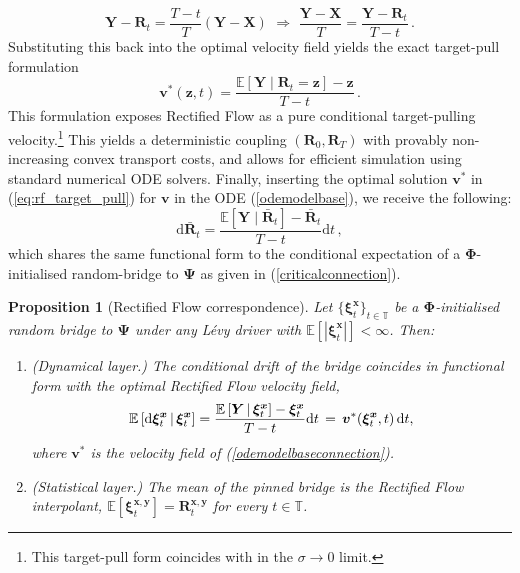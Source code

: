 \documentclass{article}
\newtheorem{prop}[thm]{Proposition}
\newcommand{\levy}{{L\'evy }}
\def\E{\mathbb{E}}
\def\T{\mathbb{T}}
\def\dd{\mathrm{d}}
\def\xib{\boldsymbol{\xi}}
\theoremstyle{definition}
\begin{document}
\begin{equation}
    \boldsymbol{Y} - \boldsymbol{R}_t = \frac{T-t}{T}(\boldsymbol{Y} - \boldsymbol{X}) \,\, \Rightarrow \,\,\frac{\boldsymbol{Y}-\boldsymbol{X}}{T} = \frac{\boldsymbol{Y} - \boldsymbol{R}_t}{T-t} \, .
\end{equation}
Substituting this back into the optimal velocity field yields the exact target-pull formulation
\begin{equation}
    \boldsymbol{v}^*(\boldsymbol{z},t) = \frac{\mathbb{E}[\boldsymbol{Y} \mid \boldsymbol{R}_t = \boldsymbol{z}] - \boldsymbol{z}}{T-t} \, . \label{eq:rf_target_pull}
\end{equation}
This formulation exposes Rectified Flow as a pure conditional target-pulling velocity.\footnote{This target-pull form coincides with \cite[Eq.~(5)]{shi2023diffusion} in the $\sigma\to0$ limit.} This yields a deterministic coupling $(\boldsymbol{R}_0, \boldsymbol{R}_T)$ with provably non-increasing convex transport costs, and allows for efficient simulation using standard numerical ODE solvers.
Finally, inserting the optimal solution $\boldsymbol{v}^*$ in (\ref{eq:rf_target_pull}) for $\boldsymbol{v}$ in the ODE (\ref{odemodelbase}), we receive the following:
\begin{equation}
    \mathrm{d}\bar{\boldsymbol{R}}_t = \frac{\mathbb{E}[\boldsymbol{Y} \mid \bar{\boldsymbol{R}}_t] - \bar{\boldsymbol{R}}_t}{T-t}\mathrm{d}t \, , \label{odemodelbaseconnection}
\end{equation}
which shares the same functional form to the conditional expectation of a $\boldsymbol{\Phi}$-initialised random-bridge to $\boldsymbol{\Psi}$ as given in (\ref{criticalconnection}).
\begin{prop}[Rectified Flow correspondence]
\label{coredynamicconnection}
Let $\{\xib^{\boldsymbol{x}}_t\}_{t\in\T}$ be a $\boldsymbol{\Phi}$-initialised random bridge to $\boldsymbol{\Psi}$ under \emph{any} \levy driver with $\E[|\xib^{\boldsymbol{x}}_t|] < \infty$. Then:
\begin{enumerate}
    \item[(i)] \emph{(Dynamical layer.)} The conditional drift of the bridge coincides in functional form with the optimal Rectified Flow velocity field,
    \begin{align}
        \E\left[\dd \xib^{\boldsymbol{x}}_{t} \,|\, \xib^{\boldsymbol{x}}_{t} \right] = \frac{\E\left[ \boldsymbol{Y} \, | \, \xib^{\boldsymbol{x}}_t \right]  - \xib^{\boldsymbol{x}}_t }{T-t}\dd t \, = \, \boldsymbol{v}^*(\xib^{\boldsymbol{x}}_t, t)\,\dd t, \notag
    \end{align}
    where $\boldsymbol{v}^*$ is the velocity field of (\ref{odemodelbaseconnection}).
    \item[(ii)] \emph{(Statistical layer.)} The mean of the pinned bridge is the Rectified Flow interpolant, $\E[\boldsymbol{\xi}^{\boldsymbol{x},\boldsymbol{y}}_t] = \boldsymbol{R}^{\boldsymbol{x,y}}_t$ for every $t \in \T$.
\end{enumerate}
\end{prop}
\end{document}
